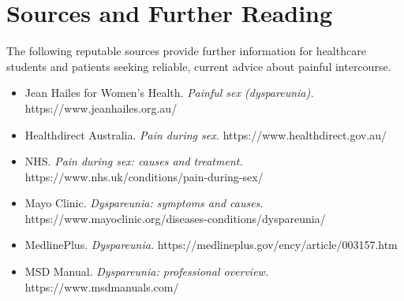 \section*{Sources and Further Reading}
The following reputable sources provide further information for healthcare students and patients seeking reliable, current advice about painful intercourse.
\begin{itemize}
    \item Jean Hailes for Women's Health. \textit{Painful sex (dyspareunia).} https://www.jeanhailes.org.au/
    \item Healthdirect Australia. \textit{Pain during sex.} https://www.healthdirect.gov.au/
    \item NHS. \textit{Pain during sex: causes and treatment.} https://www.nhs.uk/conditions/pain-during-sex/
    \item Mayo Clinic. \textit{Dyspareunia: symptoms and causes.} https://www.mayoclinic.org/diseases-conditions/dyspareunia/
    \item MedlinePlus. \textit{Dyspareunia.} https://medlineplus.gov/ency/article/003157.htm
    \item MSD Manual. \textit{Dyspareunia: professional overview.} https://www.msdmanuals.com/
\end{itemize}
